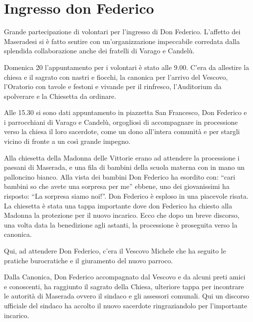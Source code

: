 \section{Ingresso don Federico}



Grande partecipazione di volontari per l'ingresso di Don Federico. L'affetto dei Maseradesi si è fatto sentire con un'organizzazione impeccabile corredata dalla splendida collaborazione anche dei fratelli di Varago e Candelù.


Domenica 20 l'appuntamento per i volontari è stato alle 9.00. C'era da allestire la chiesa e il sagrato con nastri e fiocchi, la canonica per l'arrivo del Vescovo, l'Oratorio con tavole e festoni e vivande per il rinfresco, l'Auditorium da spolverare e la Chiesetta da ordinare.

Alle 15.30 si sono dati appuntamento in piazzetta San Francesco, Don Federico e i parrocchiani di Varago e Candelù, orgogliosi di accompagnare in processione verso la chiesa il loro sacerdote, come un dono all'intera comunità e per stargli vicino di fronte a un così grande impegno.

Alla chiesetta della Madonna delle Vittorie erano ad attendere la processione i paesani di Maserada, e una fila di bambini della scuola materna con in mano un palloncino bianco. Alla vista dei bambini Don Federico ha esordito con: ``cari bambini so che avete una sorpresa per me'' ebbene, uno dei giovanissimi ha risposto: ``La sorpresa siamo noi!''. Don Federico è esploso in una piacevole risata. La chiesetta è stata una tappa importante dove don Federico ha chiesto alla Madonna la protezione per il nuovo incarico. Ecco che dopo un breve discorso, una volta data la benedizione agli astanti, la processione è proseguita verso la canonica.

Qui, ad attendere Don Federico, c'era il Vescovo Michele che ha seguito le pratiche burocratiche e il giuramento del nuovo parroco.

Dalla Canonica, Don Federico accompagnato dal Vescovo e da alcuni preti amici e conoscenti, ha raggiunto il sagrato della Chiesa, ulteriore tappa per incontrare le autorità di Maserada ovvero il sindaco e gli assessori comunali. Qui un discorso ufficiale del sindaco ha accolto il nuovo sacerdote ringraziandolo per l'importante incarico.

